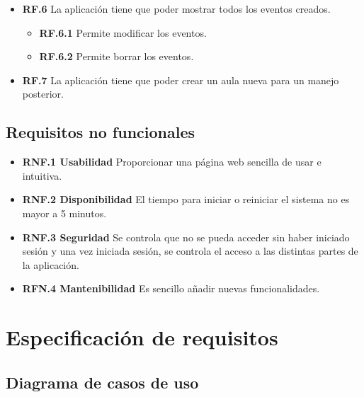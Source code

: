 \begin{itemize}
\begin{itemize}
    \end{itemize}
    \item \textbf{RF.6} La aplicación tiene que poder mostrar todos los eventos creados.
    \begin{itemize}
        \item \textbf{RF.6.1} Permite modificar los eventos.
        \item \textbf{RF.6.2} Permite borrar los eventos.
    \end{itemize}
    \item \textbf{RF.7} La aplicación tiene que poder crear un aula nueva para un manejo posterior.
     
    
    
\end{itemize}


\subsection{Requisitos no funcionales}
\begin{itemize}
	\item \textbf{RNF.1 Usabilidad} Proporcionar una página web sencilla de usar e intuitiva.
	\item \textbf{RNF.2 Disponibilidad} El tiempo para iniciar o reiniciar el sistema no es mayor a 5 minutos.
	\item \textbf{RNF.3 Seguridad} Se controla que no se pueda acceder sin haber iniciado sesión y una vez iniciada sesión, se controla el acceso a las distintas partes de la aplicación.
	\item \textbf{RFN.4 Mantenibilidad} Es sencillo añadir nuevas funcionalidades.
\end{itemize}
\section{Especificación de requisitos}
\subsection{Diagrama de casos de uso}


